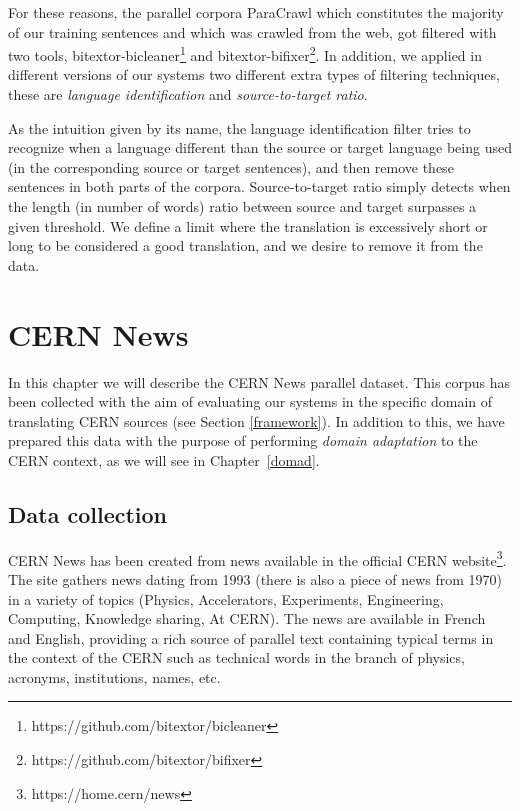 \documentclass[11pt,english,listoffigures,listoftables]{tfgetsinf}
\begin{document}
For these reasons, the parallel corpora ParaCrawl which constitutes the majority of our training sentences and which was crawled from the web, got filtered with two tools, bitextor-bicleaner\footnote{https://github.com/bitextor/bicleaner} and bitextor-bifixer\footnote{https://github.com/bitextor/bifixer}. In addition, we applied in different versions of our systems two different extra types of filtering techniques, these are \textit{language identification} and \textit{source-to-target ratio}.

As the intuition given by its name, the language identification filter tries to recognize when a language different than the source or target language being used (in the corresponding source or target sentences), and then remove these sentences in both parts of the corpora.
Source-to-target ratio simply detects when the length (in number of words) ratio between source and target surpasses a given threshold. We define a limit where the translation is excessively short or long to be considered a good translation, and we desire to remove it from the data.







\chapter{CERN News}\label{tres}
In this chapter we will describe the CERN News parallel dataset. This corpus has been collected with the aim of evaluating our systems in the specific domain of translating CERN sources
(see Section \ref{framework}). In addition to this, we have prepared this data with the purpose of performing \textit{domain adaptation} to the CERN context, as we will see in Chapter~\ref{domad}.

\section{Data collection}
CERN News has been created from news available in the official CERN website\footnote{https://home.cern/news}. The site gathers news dating from 1993 (there is also a piece of news from 1970) in a variety of topics (Physics, Accelerators, Experiments, Engineering, Computing, Knowledge sharing, At CERN). The news are available in French and English, providing a rich source of parallel text containing typical terms in the context of the CERN such as technical words in the branch of physics, acronyms, institutions, names, etc. 
\end{document}
